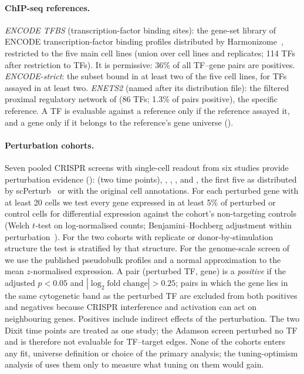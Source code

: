 \documentclass[11pt,a4paper]{article}
\begin{document}
\paragraph{ChIP-seq references.}
\emph{ENCODE TFBS} (transcription-factor binding sites): the gene-set library of ENCODE transcription-factor binding profiles distributed by Harmonizome~\citep{rouillard2016harmonizome,encode2012integrated}, restricted to the five main cell lines (union over cell lines and replicates; 114 TFs after restriction to \citet{lambert2018human} TFs). It is permissive: 36\% of all TF--gene pairs are positives.
\emph{ENCODE-strict}: the subset bound in at least two of the five cell lines, for TFs assayed in at least two.
\emph{ENETS2} (named after its distribution file): the filtered proximal regulatory network of \citet{gerstein2012architecture} (86 TFs; 1.3\% of pairs positive), the specific reference.
A TF is evaluable against a reference only if the reference assayed it, and a gene only if it belongs to the reference's gene universe ().

\paragraph{Perturbation cohorts.}
Seven pooled CRISPR screens with single-cell readout from six studies provide perturbation evidence (): \citet{dixit2016perturb} (two time points), \citet{adamson2016multiplexed}, \citet{shifrut2018genome}, \citet{norman2019exploring}, \citet{papalexi2021characterizing} and \citet{replogle2022mapping}, the first five as distributed by scPerturb~\citep{peidli2024scperturb} or with the original cell annotations.
For each perturbed gene with at least 20 cells we test every gene expressed in at least 5\% of perturbed or control cells for differential expression against the cohort's non-targeting controls (Welch $t$-test on log-normalised counts; Benjamini--Hochberg adjustment within perturbation~\citep{benjamini1995controlling}).
For the two cohorts with replicate or donor-by-stimulation structure the test is stratified by that structure.
For the genome-scale screen of \citet{replogle2022mapping} we use the published pseudobulk profiles and a normal approximation to the mean $z$-normalised expression.
A pair (perturbed TF, gene) is a \emph{positive} if the adjusted $p<0.05$ and $|\log_2 \text{fold change}|>0.25$; pairs in which the gene lies in the same cytogenetic band as the perturbed TF are excluded from both positives and negatives because CRISPR interference and activation can act on neighbouring genes.
Positives include indirect effects of the perturbation.
The two Dixit time points are treated as one study; the Adamson screen perturbed no TF and is therefore not evaluable for TF--target edges.
None of the cohorts enters any fit, universe definition or choice of the primary analysis; the tuning-optimism analysis of  uses them only to measure what tuning on them would gain.
\end{document}
